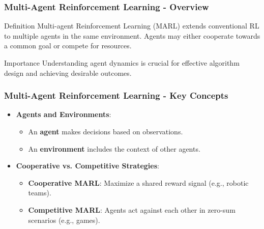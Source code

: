 \documentclass[aspectratio=169]{beamer}
\begin{document}
\begin{frame}[fragile]
    \frametitle{Multi-Agent Reinforcement Learning - Overview}
    \begin{block}{Definition}
        Multi-agent Reinforcement Learning (MARL) extends conventional RL to multiple agents in the same environment. Agents may either cooperate towards a common goal or compete for resources.
    \end{block}
    \begin{block}{Importance}
        Understanding agent dynamics is crucial for effective algorithm design and achieving desirable outcomes.
    \end{block}
\end{frame}

\begin{frame}[fragile]
    \frametitle{Multi-Agent Reinforcement Learning - Key Concepts}
    \begin{itemize}
        \item \textbf{Agents and Environments}:
        \begin{itemize}
            \item An \textbf{agent} makes decisions based on observations.
            \item An \textbf{environment} includes the context of other agents.
        \end{itemize}
        
        \item \textbf{Cooperative vs. Competitive Strategies}:
        \begin{itemize}
            \item \textbf{Cooperative MARL}: Maximize a shared reward signal (e.g., robotic teams).
            \item \textbf{Competitive MARL}: Agents act against each other in zero-sum scenarios (e.g., games).
        \end{itemize}
    \end{itemize}
\end{frame}
\end{document}

